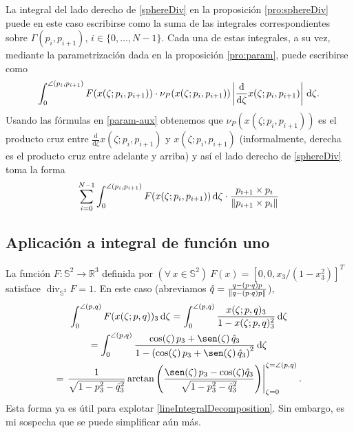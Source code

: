\documentclass[reqno]{amsart}
\newcommand{\dd}[1][y]{\if#1y\,\fi{\mathrm d}} %
\newcommand{\norm}[2][y]{\if#1y\left\fi\lVert#2\if#1y\right\fi\rVert} %
\newcommand{\abs}[2][y]{\if#1y\left\fi\lvert#2\if#1y\right\fi\rvert} %
\begin{document}
La integral del lado derecho de \eqref{sphereDiv} en la proposición \ref{pro:sphereDiv} puede en este caso escribirse como la suma de las integrales correspondientes sobre $\Gamma(p_i, p_{i+1})$, $i \in \{0, \dotsc, N-1\}$.
Cada una de estas integrales, a su vez, mediante la parametrización dada en la proposición \ref{pro:param}, puede escribirse como
%
\begin{equation*}
\int_0^{\angle(p_i, p_{i+1})} F(x(\zeta;p_i,p_{i+1})) \cdot \nu_P(x(\zeta;p_i,p_{i+1})) \abs{\frac{\mathrm{d}}{\mathrm{d}\zeta} x(\zeta;p_i,p_{i+1})} \dd \zeta.
\end{equation*}
%
Usando las fórmulas en \eqref{param-aux} obtenemos que $\nu_P(x(\zeta;p_i,p_{i+1}))$ es el producto cruz entre $\frac{\mathrm{d}}{\mathrm{d}\zeta} x(\zeta;p_i,p_{i+1})$ y $x(\zeta;p_i,p_{i+1})$ (informalmente, derecha es el producto cruz entre adelante y arriba) y así el lado derecho de \eqref{sphereDiv} toma la forma
%
\begin{equation}\label{lineIntegralDecomposition}
\sum_{i=0}^{N-1} \int_0^{\angle(p_i,p_{i+1})} F(x(\zeta;p_i,p_{i+1})) \dd \zeta \cdot \frac{p_{i+1} \times p_i}{\norm{p_{i+1} \times p_i}}
\end{equation}
%


\subsection{Aplicación a integral de función uno}

La función $F \colon \mathbb{S}^2 \to \mathbb{R}^3$ definida por $(\forall\,x\in\mathbb{S}^2)\ F(x) = [0, 0, x_3/(1-x_3^2)]^T$ satisface $\operatorname{div}_{\mathbb{S}^2} F = 1$.
En este caso (abreviamos $\hat q = \frac{q - (p\cdot q)p}{\norm{q - (p\cdot q)p}}$),
%
\begin{multline}\label{aux-1}
\int_0^{\angle(p,q)} F(x(\zeta;p,q))_3 \dd \zeta
= \int_0^{\angle(p,q)} \frac{x(\zeta;p,q)_3}{1-x(\zeta;p,q)_3^2} \dd\zeta\\
= \int_0^{\angle(p,q)} \frac{\cos(\zeta) \, p_3 + \sen(\zeta) \, \hat q_3}{1 - \left(\cos(\zeta) \, p_3 + \sen(\zeta) \, \hat q_3\right)^2} \dd \zeta\\
= \left. \frac{1}{\sqrt{1 - p_3^2 - \hat q_3^2}} \arctan\left( \frac{\sen(\zeta) \, p_3 - \cos(\zeta) \hat q_3}{\sqrt{1 - p_3^2 - \hat q_3^2}} \right) \right|_{\zeta=0}^{\zeta=\angle(p,q)}.
\end{multline}
%
Esta forma ya es útil para explotar \eqref{lineIntegralDecomposition}.
Sin embargo, es mi sospecha que se puede simplificar aún más.
\end{document}
